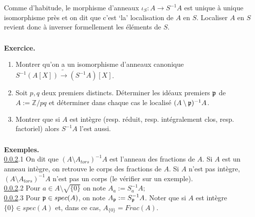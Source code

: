 \documentclass[a4paper, 12pt]{amsart}
\newcommand{\Z}{\mathbb{Z}}
\begin{document}
 \noindent Comme d'habitude, le morphisme d'anneaux  $\iota_S:A\rightarrow S^{-1}A$ est unique à unique isomorphisme près et on dit que  c'est `la' localisation de $A$ en $S$. Localiser $A$ en $S$ revient donc à inverser formellement les éléments de $S$.  \\
 
 \subsubsection{}\label{LocExo1}\textbf{Exercice.} 
 \begin{enumerate}
 \item  Montrer qu'on a un isomorphisme  d'anneaux canonique $S^{-1}(A[X])\tilde{\rightarrow} (S^{-1}A)[X]$.
 \item Soit $p,q$ deux premiers distincts. Déterminer les idéaux premiers $\frak{p}$ de $A:=\Z/pq$ et déterminer dans chaque cas le localisé $(A\setminus \frak{p})^{-1}A$.
 \item Montrer que si $A$ est intègre (resp. réduit, resp. intégralement clos, resp. factoriel) alors $S^{-1}A$ l'est aussi.\\
 \end{enumerate}
 
 
 
 \subsubsection{}\label{LocEx2}\textbf{Exemples.}\\

\noindent\ref{LocEx2}.1 On dit que $(A\setminus A_{tors})^{-1}A$ est l'anneau des fractions de $A$. Si $A$ est un anneau intègre, on retrouve le corps  des fractions de $A$. Si $A$ n'est pas intègre, $(A\setminus A_{tors})^{-1}A$ n'est pas un corps (le vérifier sur un exemple).\\

\noindent\ref{LocEx2}.2 Pour $a\in A\setminus \sqrt{\lbrace 0\rbrace}$ on note $A_a:=S_a^{-1}A $;\\

\noindent\ref{LocEx2}.3 Pour $\frak{p}\in spec(A)$, on note $A_\frak{p}:=S_{\frak{p}}^{-1}A$. Noter que si $A$ est intègre  $\lbrace 0\rbrace \in spec(A)$ et, dans ce cas, $A_{\lbrace 0\rbrace}=Frac(A)$.\\
\end{document}
